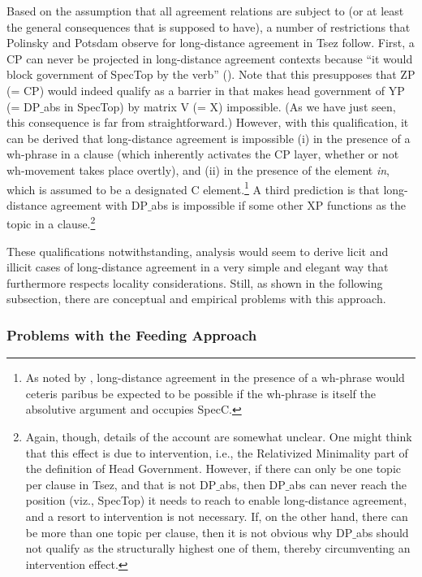 \documentclass[output=paper
,modfonts
,nonflat]{langsci/langscibook}
\begin{document}
Based on the assumption that all agreement relations are subject to
\LLast (or at least the general consequences that \LLast is supposed
to have), a number of restrictions that Polinsky and Potsdam observe for
long-distance agreement in Tsez follow. First, a CP can never be
projected in long-distance agreement contexts because ``it would block
government of SpecTop by the verb''
(). Note  that this presupposes that
ZP (= CP) would indeed qualify as a barrier in \Last that makes
head government of YP (= DP$\_${abs} in SpecTop) by matrix V (= X)
impossible. (As we have just seen, this consequence is far from
straightforward.) However, with this qualification, it can be derived
that long-distance agreement is impossible (i) in the presence of a
wh-phrase in a clause (which inherently activates the CP layer,
whether or not wh-movement takes place overtly), and (ii) in the
presence of the element {\it \textcrlambda in}, which is assumed to be
a designated C element.\footnote{\label{whabs}As noted by
  , long-distance agreement in the
  presence of a 
  wh-phrase would ceteris paribus be expected to be possible if the
  wh-phrase is itself the absolutive argument and occupies SpecC.}
 A third prediction is that long-distance
agreement with DP$\_${abs} is impossible if some other XP functions as
the topic in a clause.\footnote{Again, though, details of the account
  are somewhat unclear. One might think that this effect is due to
  intervention, i.e., the Relativized Minimality part of the
  definition of Head Government. However,  if there can only be one topic per clause in
  Tsez, and that is not DP$\_${abs}, then DP$\_${abs} can never reach the
  position (viz., SpecTop) it needs to reach to enable long-distance
  agreement, and a resort to intervention is not necessary. If, on the other hand, there can be more than one topic
  per clause, then it is not obvious why DP$\_${abs} should not qualify
  as the structurally highest one of them, thereby circumventing an
  intervention effect.}

These qualifications notwithstanding, 
analysis would seem to derive licit and illicit cases of long-distance
agreement in a very simple and elegant way that furthermore respects
locality considerations. Still, as shown in the following subsection,
there are conceptual and empirical problems with this approach.


\subsubsection{Problems with the Feeding Approach}
\end{document}
